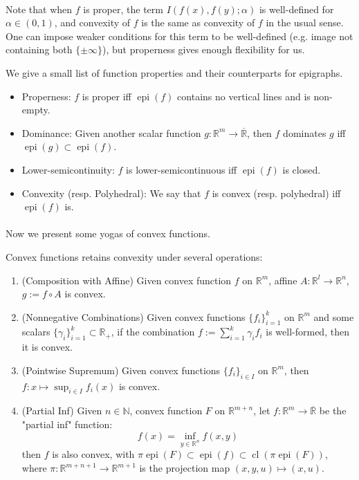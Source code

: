 \paragraph{}Note that when $f$ is proper, the term $I(f(x),f(y);\alpha)$ is well-defined for $\alpha \in(0,1)$, and convexity of $f$ is the same as convexity of $f$ in the usual sense. One can impose weaker conditions for this term to be well-defined (e.g. image not containing both $\{\pm\infty\}$), but properness gives enough flexibility for us.

\begin{rmrk}We give a small list of function properties and their counterparts for epigraphs.
	\begin{itemize}
		\item Properness: $f$ is proper iff $\operatorname{epi}(f)$ contains no vertical lines and is non-empty.
		\item Dominance: Given another scalar function $g:\mathbb{R}^m\to \overline{\mathbb{R}}$, then $f$ dominates $g$ iff $\operatorname{epi}(g)\subset \operatorname{epi}(f)$.
		\item Lower-semicontinuity: $f$ is lower-semicontinuous iff $\operatorname{epi}(f)$ is closed.
		\item Convexity (resp. Polyhedral): We say that $f$ is convex (resp. polyhedral) iff $\operatorname{epi}(f)$ is.
	\end{itemize}
\end{rmrk}

\paragraph{}Now we present some yogas of convex functions.

\begin{prop}\label{prop:021-yoga-convex-functions}
	Convex functions retains convexity under several operations:
	\begin{enumerate}[label=(\alph*)]
		\item (Composition with Affine) Given convex function $f$ on $\mathbb{R}^m$, affine $A:\mathbb{R}^l\to \mathbb{R}^n$, $g:=f\circ A$ is convex.
		\item (Nonnegative Combinations) Given convex functions $\{f_i\}_{i=1}^k$ on $\mathbb{R}^m$ and some scalars $\{\gamma_i\}_{i=1}^k\subset \mathbb{R}_{+}$, if the combination $f:=\sum_{i=1}^k \gamma_i f_i$ is well-formed, then it is convex.
		\item (Pointwise Supremum) Given convex functions $\{f_i\}_{i\in I}$ on $\mathbb{R}^m$, then $f:x\mapsto\sup_{i\in I}f_i(x)$ is convex.
		\item (Partial Inf) Given $n\in \mathbb{N}$, convex function $F$ on $\mathbb{R}^{m+n}$, let $f:\mathbb{R}^m\to \overline{\mathbb{R}}$ be the "partial inf" function:
		      \[
			      f(x)=\underset{y\in \mathbb{R}^n}{\operatorname{inf}}f(x,y)
		      \]
		      then $f$ is also convex, with $\pi \operatorname{epi}(F)\subset \operatorname{epi}(f)\subset \operatorname{cl}(\pi \operatorname{epi}(F))$, where $\pi:\mathbb{R}^{m+n+1}\to \mathbb{R}^{m+1}$ is the projection map $(x,y,u)\mapsto (x,u)$.
	\end{enumerate}
\end{prop}

